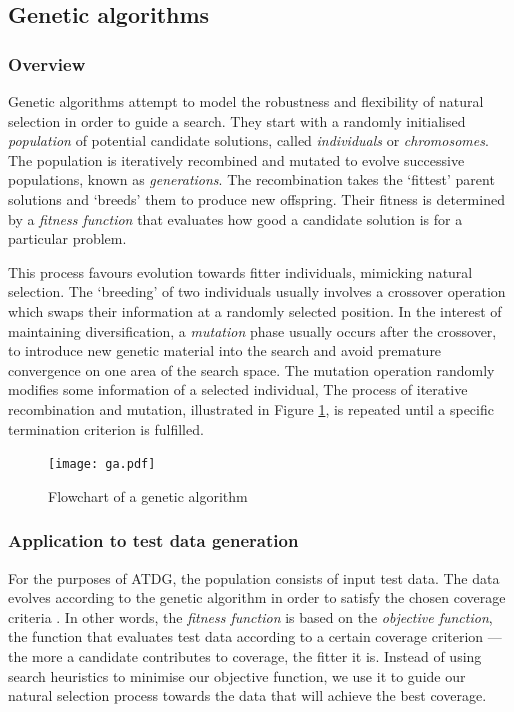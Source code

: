 \documentclass[a4paper,11pt,titlepage]{report}
\begin{document}
\subsection{Genetic algorithms}

\subsubsection{Overview}
Genetic algorithms attempt to model the robustness and flexibility of natural selection in order to guide a search\cite{michael2001generating}. They start with a randomly initialised \emph{population} of potential candidate solutions, called \emph{individuals} or \emph{chromosomes}. The population is iteratively recombined and mutated to evolve successive populations, known as \emph{generations}. The recombination takes the `fittest' parent solutions and `breeds' them to produce new offspring. Their fitness is determined by a \emph{fitness function} that evaluates how good a candidate solution is for a particular problem.

This process favours evolution towards fitter individuals, mimicking natural selection. The `breeding' of two individuals usually involves a crossover operation which swaps their information at a randomly selected position. In the interest of maintaining diversification, a \emph{mutation} phase usually occurs after the crossover, to introduce new genetic material into the search and avoid premature convergence on one area of the search space. The mutation operation randomly modifies some information of a selected individual, The process of iterative recombination and mutation, illustrated in Figure \ref{ga}, is repeated until a specific termination criterion is fulfilled.

\begin{figure}
\hspace*{0.7cm}
\centering
\texttt{[image: ga.pdf]}
\caption{Flowchart of a genetic algorithm}
\label{ga}
\end{figure}

\subsubsection{Application to test data generation}
\label{subsubsec:ga_application}
For the purposes of ATDG, the population consists of input test data. The data evolves according to the genetic algorithm in order to satisfy the chosen coverage criteria \cite{michael2001generating}. In other words, the \emph{fitness function} is based on the \emph{objective function}, the function that evaluates test data according to a certain coverage criterion --- the more a candidate contributes to coverage, the fitter it is. Instead of using search heuristics to minimise our objective function, we use it to guide our natural selection process towards the data that will achieve the best coverage.
\end{document}
